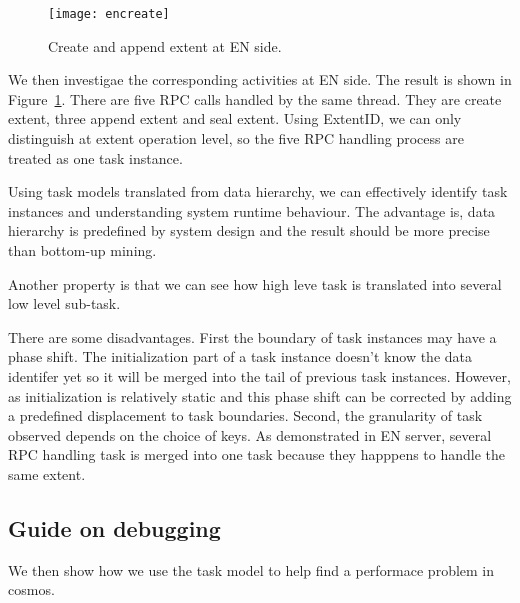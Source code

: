 \begin{figure}
\centering
\texttt{[image: encreate]}
\caption{Create and append extent at EN side.}
\label{fig:encreate}
\end{figure}

We then investigae the corresponding activities at EN side.
The result is shown in Figure~\ref{fig:encreate}. There
are five RPC calls handled by the same thread. They are
create extent, three append extent and seal extent. Using
ExtentID, we can only distinguish at extent operation level,
so the five RPC handling process are treated as one task
instance.

\lesson Using task models translated from data hierarchy, we
can effectively identify task instances and understanding
system runtime behaviour. The advantage is, data
hierarchy is predefined by system design and the result
should be more precise than bottom-up mining.

Another property is that we can see how high leve task is
translated into several low level sub-task.


There are some disadvantages. First the boundary of task
instances may have a phase shift. The initialization part of
a task instance doesn't know the data identifer yet so it
will be merged into the tail of previous task instances.
However, as initialization is relatively static and this
phase shift can be corrected by adding a predefined
displacement to task boundaries. Second, the granularity of
task observed depends on the choice of keys. As demonstrated
in EN server, several RPC handling task is merged into one
task because they happpens to handle the same extent.

\subsection{Guide on debugging}

We then show how we use the task model to help find a
performace problem in cosmos.

